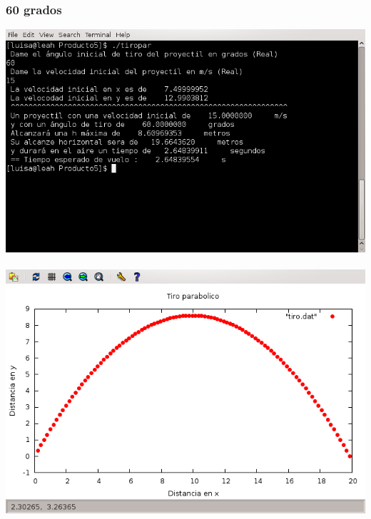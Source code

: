 \documentclass[10pt]{article}
\begin{document}
\newpage

\subsubsection{60 grados}
\includegraphics[scale=0.6]{screen60.png} \\
\\
\includegraphics[scale=0.6]{grafica60.png} 

\newpage
\end{document}
